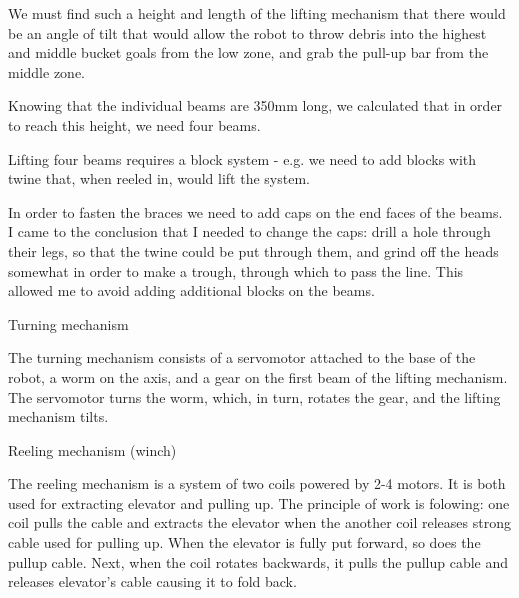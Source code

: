 \begin{enumerate*}
\begin{enumerate*}
\begin{enumerate*}
       \item We must find such a height and length of the lifting mechanism that there would be an angle of tilt that would allow the robot to throw debris into the highest and middle bucket goals from the low zone, and grab the pull-up bar from the middle zone.

       \item Knowing that the individual beams are 350mm long, we calculated that in order to reach this height, we need four beams.

       \item Lifting four beams requires a block system - e.g. we need to add blocks with twine that, when reeled in, would lift the system.

       \item In order to fasten the braces we need to add caps on the end faces of the beams. I came to the conclusion that I needed to change the caps: drill a hole through their legs, so that the twine could be put through them, and grind off the heads somewhat in order to make a trough, through which to pass the line. This allowed me to avoid adding additional blocks on the beams.
    \end{enumerate*}
    \item Turning mechanism
    \begin{enumerate*}
       \item The turning mechanism consists of a servomotor attached to the base of the robot, a worm on the axis, and a gear on the first beam of the lifting mechanism. The servomotor turns the worm, which, in turn, rotates the gear, and the lifting mechanism tilts.
    \end{enumerate*}

    \item Reeling mechanism (winch)
    \begin{enumerate*}
    	\item The reeling mechanism is a system of two coils powered by 2-4 motors. It is both used for extracting elevator and pulling up. The principle of work is folowing: one coil pulls the cable and extracts the elevator when the another coil releases strong cable used for pulling up. When the elevator is fully put forward, so does the pullup cable. Next, when the coil rotates backwards, it pulls the pullup cable and releases elevator's cable causing it to fold back.
    \end{enumerate*}

  \end{enumerate*}	


\end{enumerate*}
